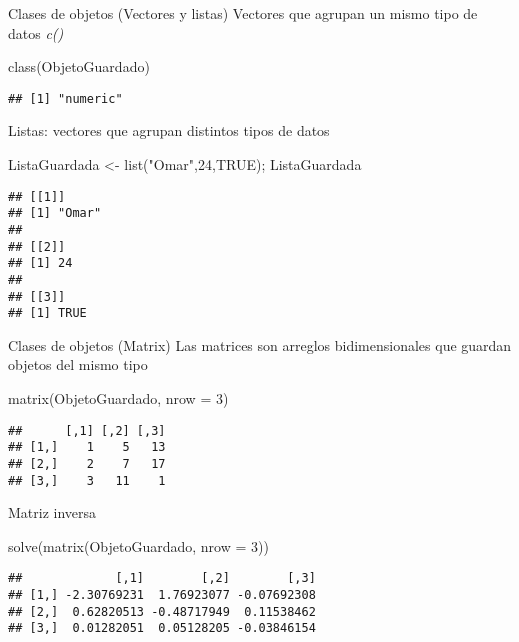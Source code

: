 \documentclass[
  10,
  ignorenonframetext,
]{beamer}
\newenvironment{Shaded}{\begin{snugshade}}{\end{snugshade}}
\newcommand{\AttributeTok}[1]{\textcolor[rgb]{0.77,0.63,0.00}{#1}}
\newcommand{\ConstantTok}[1]{\textcolor[rgb]{0.00,0.00,0.00}{#1}}
\newcommand{\DecValTok}[1]{\textcolor[rgb]{0.00,0.00,0.81}{#1}}
\newcommand{\FunctionTok}[1]{\textcolor[rgb]{0.00,0.00,0.00}{#1}}
\newcommand{\NormalTok}[1]{#1}
\newcommand{\OtherTok}[1]{\textcolor[rgb]{0.56,0.35,0.01}{#1}}
\newcommand{\StringTok}[1]{\textcolor[rgb]{0.31,0.60,0.02}{#1}}
\begin{document}
\begin{frame}[fragile]{Clases de objetos (Vectores y listas)}
\protect\hypertarget{clases-de-objetos-vectores-y-listas}{}
Vectores que agrupan un mismo tipo de datos \emph{c()}

\begin{Shaded}
\begin{Highlighting}[]
\FunctionTok{class}\NormalTok{(ObjetoGuardado)}
\end{Highlighting}
\end{Shaded}

\begin{verbatim}
## [1] "numeric"
\end{verbatim}

Listas: vectores que agrupan distintos tipos de datos

\begin{Shaded}
\begin{Highlighting}[]
\NormalTok{ListaGuardada }\OtherTok{\textless{}{-}} \FunctionTok{list}\NormalTok{(}\StringTok{"Omar"}\NormalTok{,}\DecValTok{24}\NormalTok{,}\ConstantTok{TRUE}\NormalTok{); ListaGuardada}
\end{Highlighting}
\end{Shaded}

\begin{verbatim}
## [[1]]
## [1] "Omar"
## 
## [[2]]
## [1] 24
## 
## [[3]]
## [1] TRUE
\end{verbatim}
\end{frame}

\begin{frame}[fragile]{Clases de objetos (Matrix)}
\protect\hypertarget{clases-de-objetos-matrix}{}
Las matrices son arreglos bidimensionales que guardan objetos del mismo
tipo

\begin{Shaded}
\begin{Highlighting}[]
\FunctionTok{matrix}\NormalTok{(ObjetoGuardado, }\AttributeTok{nrow =} \DecValTok{3}\NormalTok{)}
\end{Highlighting}
\end{Shaded}

\begin{verbatim}
##      [,1] [,2] [,3]
## [1,]    1    5   13
## [2,]    2    7   17
## [3,]    3   11    1
\end{verbatim}

Matriz inversa

\begin{Shaded}
\begin{Highlighting}[]
\FunctionTok{solve}\NormalTok{(}\FunctionTok{matrix}\NormalTok{(ObjetoGuardado, }\AttributeTok{nrow =} \DecValTok{3}\NormalTok{))}
\end{Highlighting}
\end{Shaded}

\begin{verbatim}
##             [,1]        [,2]        [,3]
## [1,] -2.30769231  1.76923077 -0.07692308
## [2,]  0.62820513 -0.48717949  0.11538462
## [3,]  0.01282051  0.05128205 -0.03846154
\end{verbatim}
\end{frame}
\end{document}
